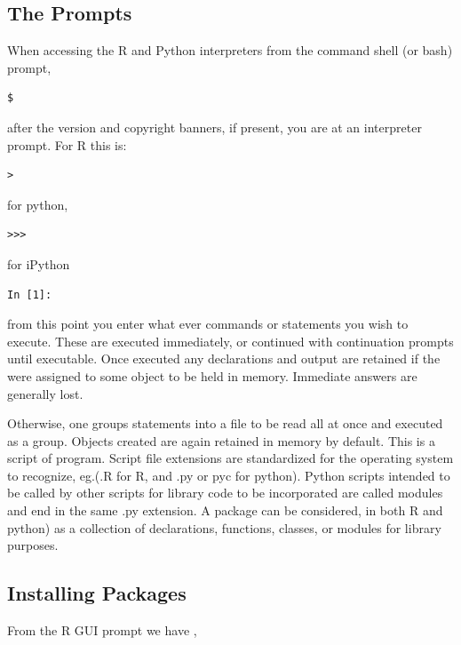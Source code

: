 \documentclass[]{book}
\theoremstyle{definition}
\theoremstyle{definition}
\theoremstyle{definition}
\theoremstyle{remark}
\begin{document}
\subsection{The Prompts}\label{the-prompts}

When accessing the R and Python interpreters from the command shell (or
bash) prompt,

\begin{verbatim}
$
\end{verbatim}

after the version and copyright banners, if present, you are at an
interpreter prompt. For R this is:

\begin{verbatim}
>
\end{verbatim}

for python,

\begin{verbatim}
>>>
\end{verbatim}

for iPython

\begin{verbatim}
In [1]:
\end{verbatim}

from this point you enter what ever commands or statements you wish to
execute. These are executed immediately, or continued with continuation
prompts until executable. Once executed any declarations and output are
retained if the were assigned to some object to be held in memory.
Immediate answers are generally lost.

Otherwise, one groups statements into a file to be read all at once and
executed as a group. Objects created are again retained in memory by
default. This is a script of program. Script file extensions are
standardized for the operating system to recognize, eg.(.R for R, and
.py or pyc for python). Python scripts intended to be called by other
scripts for library code to be incorporated are called modules and end
in the same .py extension. A package can be considered, in both R and
python) as a collection of declarations, functions, classes, or modules
for library purposes.

\subsection{\texorpdfstring{Installing Packages
}{Installing Packages }}\label{installing-packages}

From the R GUI prompt we have ,
\end{document}
